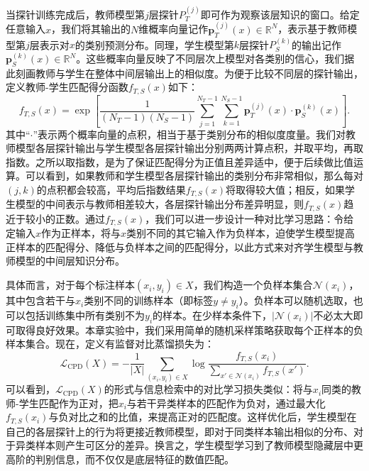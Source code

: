\documentclass[../main.tex]{subfiles}
\begin{document}
当探针训练完成后，教师模型第$j$层探针$P_T^{(j)}$即可作为观察该层知识的窗口。给定任意输入$x$，我们将其输出的$N$维概率向量记作$\mathbf{p}_T^{(j)}(x)\in\mathbb{R}^N$，表示基于教师模型第$j$层表示对$x$的类别预测分布。同理，学生模型第$k$层探针$P_S^{(k)}$的输出记作$\mathbf{p}_S^{(k)}(x) \in\mathbb{R}^N$。这些概率向量反映了不同层次上模型对各类别的信心，我们据此刻画教师与学生在整体中间层输出上的相似度。为便于比较不同层的探针输出，定义教师-学生匹配得分函数$f_{T,S}(x)$如下：
\begin{equation}
	\label{eq:f-match}
	f_{T,S}(x) = \exp\left[\frac{1}{(N_T-1)(N_S-1)} \sum_{j=1}^{N_T-1}\sum_{k=1}^{N_S-1} \mathbf{p}_T^{(j)}(x) \cdot \mathbf{p}_S^{(k)}(x)\right] .
\end{equation}
其中“$\cdot$”表示两个概率向量的点积，相当于基于类别分布的相似度度量。我们对教师模型各层探针输出与学生模型各层探针输出分别两两计算点积，并取平均，再取指数。之所以取指数，是为了保证匹配得分为正值且差异适中，便于后续做比值运算。可以看到，如果教师和学生模型各层探针输出的类别分布非常相似，那么每对$(j,k)$的点积都会较高，平均后指数结果$f_{T,S}(x)$将取得较大值；相反，如果学生模型的中间表示与教师相差较大，各层探针输出分布差异明显，则$f_{T,S}(x)$趋近于较小的正数。通过$f_{T,S}(x)$，我们可以进一步设计一种对比学习思路：令给定输入$x$作为正样本，将与$x$类别不同的其它输入作为负样本，迫使学生模型提高正样本的匹配得分、降低与负样本之间的匹配得分，以此方式来对齐学生模型与教师模型的中间层知识分布。

具体而言，对于每个标注样本$(x_i, y_i)\in X$，我们构造一个负样本集合$\mathcal{N}(x_i)$，其中包含若干与$x_i$类别不同的训练样本（即标签$y \neq y_i$）。负样本可以随机选取，也可以包括训练集中所有类别不为$y_i$的样本。在少样本条件下，$|\mathcal{N}(x_i)|$不必太大即可取得良好效果。本章实验中，我们采用简单的随机采样策略获取每个正样本的负样本集合。现在，定义有监督对比蒸馏损失为：
\begin{equation}
	\label{eq:cpd-loss-sup}
	\mathcal{L}_{\text{CPD}}(X) = -\frac{1}{|X|} \sum_{(x_i, y_i)\in X} \log \frac{f_{T,S}(x_i)}{\sum_{x' \in \mathcal{N}(x_i)} f_{T,S}(x')} .
\end{equation}
可以看到，$\mathcal{L}_{\text{CPD}}(X)$的形式与信息检索中的对比学习损失类似：将与$x_i$同类的教师-学生匹配作为正对，把$x_i$与若干异类样本的匹配作为负对，通过最大化$f_{T,S}(x_i)$与负对比之和的比值，来提高正对的匹配度。这样优化后，学生模型在自己的各层探针上的行为将更接近教师模型，即对于同类样本输出相似的分布、对于异类样本则产生可区分的差异。换言之，学生模型学习到了教师模型隐藏层中更高阶的判别信息，而不仅仅是底层特征的数值匹配。
\end{document}

